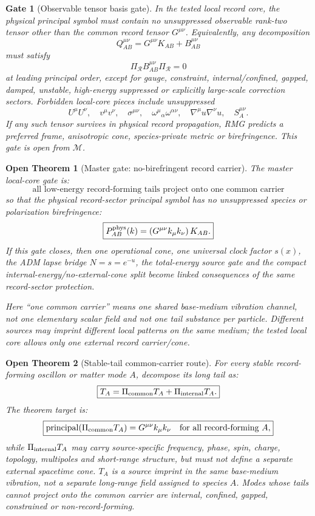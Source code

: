 \documentclass[11pt]{article}
\newtheorem{openthm}{Open Theorem}
\newtheorem{gate}{Gate}
\begin{document}
\begin{gate}[Observable tensor basis gate]
In the tested local record core, the physical principal symbol must contain no
unsuppressed observable rank-two tensor other than the common record tensor
\(G^{\mu\nu}\).  Equivalently, any decomposition
\[
\boxed{
Q_{AB}^{\mu\nu}
=
G^{\mu\nu}K_{AB}
+
B_{AB}^{\mu\nu}
}
\]
must satisfy
\[
\boxed{
\Pi_{\mathcal R}B_{AB}^{\mu\nu}\Pi_{\mathcal R}=0
}
\]
at leading principal order, except for gauge, constraint, internal/confined,
gapped, damped, unstable, high-energy suppressed or explicitly large-scale
correction sectors.  Forbidden local-core pieces include unsuppressed
\[
\boxed{
U^\mu U^\nu,\quad
v^\mu v^\nu,\quad
\sigma^{\mu\nu},\quad
\omega^\mu{}_\alpha\omega^{\alpha\nu},\quad
\nabla^\mu u\nabla^\nu u,\quad
S_A^{\mu\nu}.
}
\]
If any such tensor survives in physical record propagation, RMG predicts a
preferred frame, anisotropic cone, species-private metric or birefringence.
This gate is open from \(\mathcal M\).
\end{gate}

\begin{openthm}[Master gate: no-birefringent record carrier]
The master local-core gate is:
\[
\boxed{
\text{all low-energy record-forming tails project onto one common carrier}
}
\]
so that the physical record-sector principal symbol has no unsuppressed
species or polarization birefringence:
\[
\boxed{
P_{AB}^{\rm phys}(k)
=
\left(G^{\mu\nu}k_\mu k_\nu\right)K_{AB}.
}
\]
If this gate closes, then one operational cone, one universal clock factor
\(s(x)\), the ADM lapse bridge \(N=s=e^{-u}\), the total-energy source gate
and the compact internal-energy/no-external-cone split become linked
consequences of the same record-sector protection.

Here ``one common carrier'' means one shared base-medium vibration channel, not
one elementary scalar field and not one tail substance per particle.  Different
sources may imprint different local patterns on the same medium; the tested
local core allows only one external record carrier/cone.
\end{openthm}

\begin{openthm}[Stable-tail common-carrier route]
For every stable record-forming oscillon or matter mode \(A\), decompose its
long tail as:
\[
\boxed{
T_A=\Pi_{\rm common}T_A+\Pi_{\rm internal}T_A.
}
\]
The theorem target is:
\[
\boxed{
\operatorname{principal}(\Pi_{\rm common}T_A)
=
G^{\mu\nu}k_\mu k_\nu
\quad
\text{for all record-forming }A,
}
\]
while \(\Pi_{\rm internal}T_A\) may carry source-specific frequency, phase,
spin, charge, topology, multipoles and short-range structure, but must not
define a separate external spacetime cone.  \(T_A\) is a source imprint in the
same base-medium vibration, not a separate long-range field assigned to species
\(A\).  Modes whose tails cannot project onto the common carrier are internal,
confined, gapped, constrained or non-record-forming.
\end{openthm}
\end{document}
